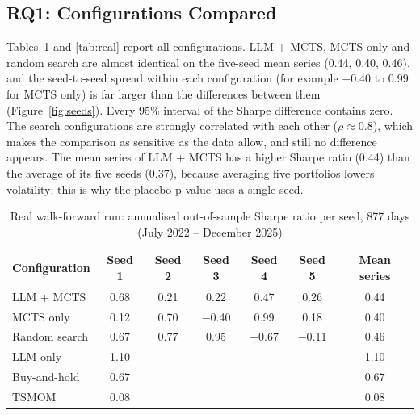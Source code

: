 \documentclass[12pt,a4paper,oneside]{book}
\theoremstyle{definition}
\begin{document}
\subsection{RQ1: Configurations Compared}

Tables~\ref{tab:real-seeds} and \ref{tab:real} report all configurations. LLM + MCTS, MCTS only and random search are almost identical on the five-seed mean series (0.44, 0.40, 0.46), and the seed-to-seed spread within each configuration (for example $-0.40$ to 0.99 for MCTS only) is far larger than the differences between them (Figure~\ref{fig:seeds}). Every 95\% interval of the Sharpe difference contains zero. The search configurations are strongly correlated with each other ($\rho \approx 0.8$), which makes the comparison as sensitive as the data allow, and still no difference appears. The mean series of LLM + MCTS has a higher Sharpe ratio (0.44) than the average of its five seeds (0.37), because averaging five portfolios lowers volatility; this is why the placebo p-value uses a single seed.

\begin{table}[H]
\centering
\caption{Real walk-forward run: annualised out-of-sample Sharpe ratio per seed, 877 days (July 2022 -- December 2025)}
\label{tab:real-seeds}
\small
\begin{tabular}{lcccccc}
\toprule
\textbf{Configuration} & \textbf{Seed 1} & \textbf{Seed 2} & \textbf{Seed 3} & \textbf{Seed 4} & \textbf{Seed 5} & \textbf{Mean series} \\
\midrule
LLM + MCTS & 0.68 & 0.21 & 0.22 & 0.47 & 0.26 & 0.44 \\
MCTS only & 0.12 & 0.70 & $-$0.40 & 0.99 & 0.18 & 0.40 \\
Random search & 0.67 & 0.77 & 0.95 & $-$0.67 & $-$0.11 & 0.46 \\
LLM only & 1.10 & & & & & 1.10 \\
Buy-and-hold & 0.67 & & & & & 0.67 \\
TSMOM & 0.08 & & & & & 0.08 \\
\bottomrule
\end{tabular}
\end{table}
\end{document}
